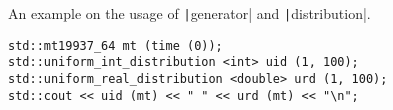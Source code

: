 An example on the usage of \texttt|generator| and \texttt|distribution|.

\begin{verbatim}
std::mt19937_64 mt (time (0));
std::uniform_int_distribution <int> uid (1, 100);
std::uniform_real_distribution <double> urd (1, 100);
std::cout << uid (mt) << " " << urd (mt) << "\n";
\end{verbatim}

